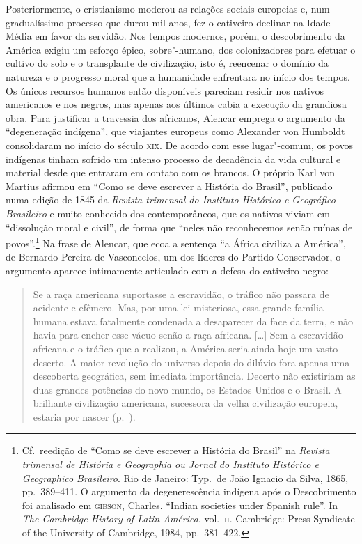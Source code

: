 Posteriormente, o cristianismo moderou as relações sociais europeias e,
num gradualíssimo processo que durou mil anos, fez o cativeiro
declinar na Idade Média em favor da servidão. Nos tempos modernos, porém, 
o descobrimento da América exigiu um esforço épico, sobre"-humano, dos 
colonizadores para efetuar o cultivo do solo e o transplante de civilização, 
isto é, reencenar o domínio da natureza e o progresso moral que 
a humanidade enfrentara no início dos tempos. Os únicos recursos humanos 
então disponíveis pareciam residir nos nativos americanos e nos negros, mas apenas 
aos últimos cabia a execução da grandiosa obra. Para justificar a travessia dos africanos,
Alencar emprega o argumento da ``degeneração indígena'', que
viajantes europeus como Alexander von Humboldt consolidaram no início
do século \textsc{xix}. De acordo com esse lugar"-comum, os povos indígenas
tinham sofrido um intenso processo de decadência da vida cultural e
material desde que entraram em contato com os brancos. O próprio Karl
von Martius afirmou em ``Como se deve escrever a História do Brasil'',
publicado numa edição de 1845 da \textit{Revista trimensal do
Instituto Histórico e Geográfico Brasileiro} e muito conhecido dos
contemporâneos, que os nativos viviam em ``dissolução moral e civil'', de
forma que ``neles não reconhecemos senão ruínas de povos''.\footnote{ Cf.~reedição 
de ``Como se deve escrever a História do Brasil'' na
\textit{Revista trimensal de História e Geographia ou Jornal do
Instituto Histórico e Geographico Brasileiro}. Rio de Janeiro: Typ.~de
João Ignacio da Silva, 1865, pp.~389--411. O argumento da degenerescência
indígena após o Descobrimento foi analisado em \textsc{gibson}, Charles.
``Indian societies under Spanish rule''. In \textit{The Cambridge History of
Latin América}, vol.~\textsc{ii}. Cambridge: Press Syndicate of the University of
Cambridge, 1984, pp.~381--422.} Na frase de Alencar, que ecoa a
sentença ``a África civiliza a América'', de Bernardo Pereira de
Vasconcelos, um dos líderes do Partido Conservador, o argumento aparece
intimamente articulado com a defesa do cativeiro negro: 

\begin{quote}
Se a raça americana suportasse a escravidão, o tráfico não passara de
acidente e efêmero. Mas, por uma lei misteriosa, essa grande família
humana estava fatalmente condenada a desaparecer da face da terra, e
não havia para encher esse vácuo senão a raça africana. [\ldots{}]
Sem a escravidão africana e o tráfico que a realizou, a América seria
ainda hoje um vasto deserto. A maior revolução do universo depois do
dilúvio fora apenas uma descoberta geográfica, sem imediata
importância. Decerto não existiriam as duas grandes potências do novo
mundo, os Estados Unidos e o Brasil. A brilhante civilização americana,
sucessora da velha civilização europeia, estaria por nascer (p.~\pageref{racaamericana}).
\end{quote}

